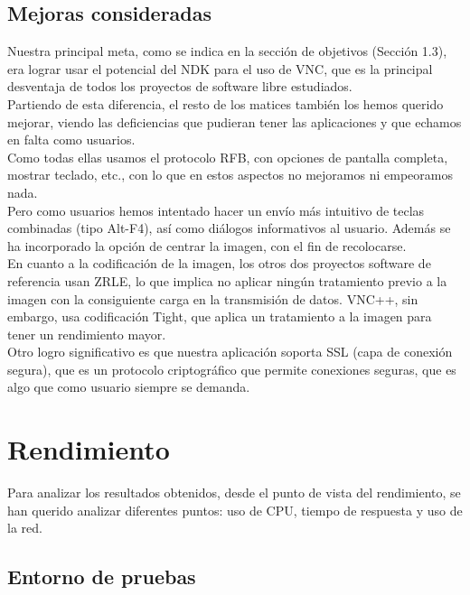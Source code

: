 \subsection{Mejoras consideradas}

Nuestra principal meta, como se indica en la sección de objetivos (Sección 1.3), era lograr usar el potencial del NDK para el uso de VNC, que es la principal desventaja de todos los proyectos de software libre estudiados.\\

Partiendo de esta diferencia, el resto de los matices también los hemos querido mejorar, viendo las deficiencias que pudieran tener las aplicaciones y que echamos en falta como usuarios.\\

Como todas ellas usamos el protocolo RFB, con opciones de pantalla completa, mostrar teclado, etc., con lo que en estos aspectos no mejoramos ni empeoramos nada.\\

Pero como usuarios hemos intentado hacer un envío más intuitivo de teclas combinadas (tipo Alt-F4), así como diálogos informativos al usuario. Además se ha incorporado la opción de centrar la imagen, con el fin de recolocarse.\\

En cuanto a la codificación de la imagen, los otros dos proyectos software de referencia usan ZRLE, lo que implica no aplicar ningún tratamiento previo a la imagen con la consiguiente carga en la transmisión de datos. VNC++, sin embargo, usa codificación Tight, que aplica un tratamiento a la imagen para tener un rendimiento mayor.\\

Otro logro significativo es que nuestra aplicación soporta SSL (capa de conexión segura), que es un protocolo criptográfico que permite conexiones seguras, que es algo que como usuario siempre se demanda.
\section{Rendimiento}

Para analizar los resultados obtenidos, desde el punto de vista del rendimiento, se han querido analizar diferentes puntos: uso de CPU, tiempo de respuesta y uso de la red.

\subsection{Entorno de pruebas}

